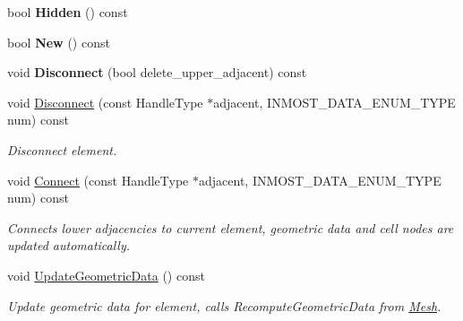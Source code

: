 \begin{DoxyCompactItemize}
\item 
\hypertarget{classINMOST_1_1Element_a47104b37b08a694ec9da21a4e0a158eb}{bool {\bfseries Hidden} () const }\label{classINMOST_1_1Element_a47104b37b08a694ec9da21a4e0a158eb}

\item 
\hypertarget{classINMOST_1_1Element_ad4f1593d17c29484b3b6d72cc17a76ba}{bool {\bfseries New} () const }\label{classINMOST_1_1Element_ad4f1593d17c29484b3b6d72cc17a76ba}

\item 
\hypertarget{classINMOST_1_1Element_a1472c6e7f2e52366dedba12c6138bc17}{void {\bfseries Disconnect} (bool delete\-\_\-upper\-\_\-adjacent) const }\label{classINMOST_1_1Element_a1472c6e7f2e52366dedba12c6138bc17}

\item 
void \hyperlink{classINMOST_1_1Element_a1fdc3e5b00005d5831bb62222823a737}{Disconnect} (const Handle\-Type $\ast$adjacent, I\-N\-M\-O\-S\-T\-\_\-\-D\-A\-T\-A\-\_\-\-E\-N\-U\-M\-\_\-\-T\-Y\-P\-E num) const 
\begin{DoxyCompactList}\small\item\em Disconnect element. \end{DoxyCompactList}\item 
void \hyperlink{classINMOST_1_1Element_a96bd136b0f249c958fc8632553aa3b58}{Connect} (const Handle\-Type $\ast$adjacent, I\-N\-M\-O\-S\-T\-\_\-\-D\-A\-T\-A\-\_\-\-E\-N\-U\-M\-\_\-\-T\-Y\-P\-E num) const 
\begin{DoxyCompactList}\small\item\em Connects lower adjacencies to current element, geometric data and cell nodes are updated automatically. \end{DoxyCompactList}\item 
\hypertarget{classINMOST_1_1Element_ad226d6f51de0ee33111fa2d9ee77e2ce}{void \hyperlink{classINMOST_1_1Element_ad226d6f51de0ee33111fa2d9ee77e2ce}{Update\-Geometric\-Data} () const }\label{classINMOST_1_1Element_ad226d6f51de0ee33111fa2d9ee77e2ce}

\begin{DoxyCompactList}\small\item\em Update geometric data for element, calls Recompute\-Geometric\-Data from \hyperlink{classINMOST_1_1Mesh}{Mesh}. \end{DoxyCompactList}\end{DoxyCompactItemize}
